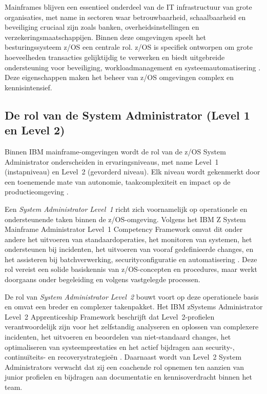 Mainframes blijven een essentieel onderdeel van de IT infrastructuur van grote organisaties, met name in sectoren waar betrouwbaarheid, schaalbaarheid en beveiliging cruciaal zijn zoals banken, overheidsinstellingen en verzekeringsmaatschappijen.
Binnen deze omgevingen speelt het besturingssysteem z/OS een centrale rol. z/OS is specifiek ontworpen om grote hoeveelheden transacties gelijktijdig te verwerken en biedt uitgebreide ondersteuning voor beveiliging, workloadmanagement en systeemautomatisering \autocite{IBMZArchitecture}. Deze eigenschappen maken het beheer van z/OS omgevingen complex en kennisintensief.

\subsection{De rol van de System Administrator (Level 1 en Level 2)}

Binnen IBM mainframe-omgevingen wordt de rol van de z/OS System Administrator onderscheiden in ervaringsniveaus, met name Level~1 (instapniveau) en Level~2 (gevorderd niveau). Elk niveau wordt gekenmerkt door een toenemende mate van autonomie, taakcomplexiteit en impact op de productieomgeving \autocite{IBMZSysAdminLevel1,IBMZSysAdminLevel2}.

Een \textit{System Administrator Level~1} richt zich voornamelijk op operationele en ondersteunende taken binnen de z/OS-omgeving. Volgens het IBM Z System Mainframe Administrator Level~1 Competency Framework omvat dit onder andere het uitvoeren van standaardoperaties, het monitoren van systemen, het ondersteunen bij incidenten, het uitvoeren van vooraf gedefinieerde changes, en het assisteren bij batchverwerking, securityconfiguratie en automatisering \autocite{IBMZSysAdminLevel1}. Deze rol vereist een solide basiskennis van z/OS-concepten en procedures, maar werkt doorgaans onder begeleiding en volgens vastgelegde processen.

De rol van \textit{System Administrator Level~2} bouwt voort op deze operationele basis en omvat een breder en complexer takenpakket. Het IBM zSystems Administrator Level~2 Apprenticeship Framework beschrijft dat Level~2-profielen verantwoordelijk zijn voor het zelfstandig analyseren en oplossen van complexere incidenten, het uitvoeren en beoordelen van niet-standaard changes, het optimaliseren van systeemprestaties en het actief bijdragen aan security-, continuïteits- en recoverystrategieën \autocite{IBMZSysAdminLevel2}. Daarnaast wordt van Level~2 System Administrators verwacht dat zij een coachende rol opnemen ten aanzien van junior profielen en bijdragen aan documentatie en kennisoverdracht binnen het team.

